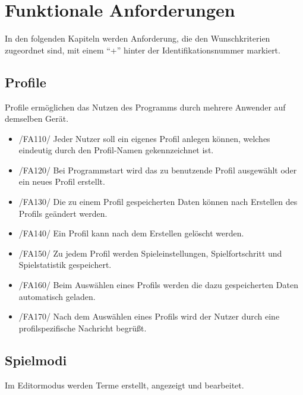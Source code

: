\section{Funktionale Anforderungen}

In den folgenden Kapiteln werden Anforderung, die den Wunschkriterien zugeordnet sind, mit einem "`+"' hinter der Identifikationsnummer markiert.

\subsection{Profile}

Profile ermöglichen das Nutzen des Programms durch mehrere Anwender auf demselben Gerät.

\begin{itemize}
\item /FA110/ Jeder Nutzer soll ein eigenes Profil anlegen können, welches eindeutig durch den Profil-Namen gekennzeichnet ist. 
\item /FA120/ Bei Programmstart wird das zu benutzende Profil ausgewählt oder ein neues Profil erstellt.
\item /FA130/ Die zu einem Profil gespeicherten Daten können nach Erstellen des Profils geändert werden.
\item /FA140/ Ein Profil kann nach dem Erstellen gelöscht werden.
\item /FA150/ Zu jedem Profil werden Spieleinstellungen, Spielfortschritt und Spielstatistik gespeichert.
\item /FA160/ Beim Auswählen eines Profils werden die dazu gespeicherten Daten automatisch geladen.
\item /FA170/ Nach dem Auswählen eines Profils wird der Nutzer durch eine profilspezifische Nachricht begrüßt.
\end{itemize}

\subsection{Spielmodi}

Im Editormodus werden Terme erstellt, angezeigt und bearbeitet.

